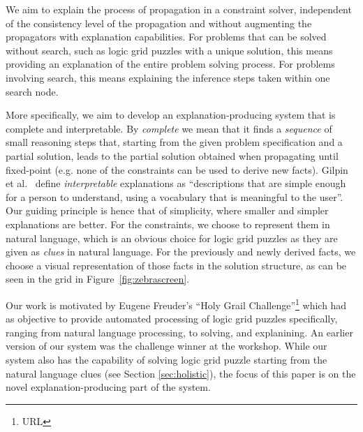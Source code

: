 We aim to explain the process of propagation in a constraint solver, independent of the consistency level of the propagation and without augmenting the propagators with explanation capabilities.
For problems that can be solved without search, such as logic grid puzzles with a unique solution, this means providing an explanation of the entire problem solving process. For problems involving search, this means explaining the inference steps taken within one search node.

More specifically, we aim to develop an explanation-producing system that is complete and interpretable. By \textit{complete} we mean that it finds a \textit{sequence} of small reasoning steps that, starting from the given problem specification and a partial solution, leads to the partial solution obtained when propagating until fixed-point (e.g. none of the constraints can be used to derive new facts). %
%
Gilpin et al.~\cite{DBLP:conf/dsaa/GilpinBYBSK18} define \textit{interpretable} explanations as ``descriptions that are simple enough for a person to understand, using a vocabulary that is meaningful to the user''. Our guiding principle is hence that of simplicity, where smaller and simpler explanations are better. %
For the constraints, we choose to represent them in natural language, which is an obvious choice for logic grid puzzles as they are given as \textit{clues} in natural language. For the previously and newly derived facts, we choose a visual representation of those facts in the solution structure, as can be seen in the grid in Figure~\ref{fig:zebrascreen}.

Our work is motivated by Eugene Freuder's ``Holy Grail Challenge''\footnote{URL} which had as objective to provide automated processing of logic grid puzzles specifically, ranging from natural language processing, to solving, and explanining. 
An earlier version of our system was the challenge winner at the workshop. 
While our system also has the capability of solving logic grid puzzle starting from the natural language clues (see Section \ref{sec:holistic}), the focus of this paper is on the novel explanation-producing part of the system.

